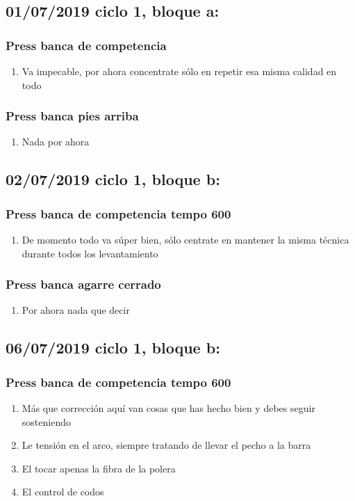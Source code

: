 \documentclass[11pt]{article}
\begin{document}
\subsection{01/07/2019 ciclo 1, bloque a:}
\label{sec:org44a0863}
\subsubsection{Press banca de competencia}
\label{sec:org559d035}
\begin{enumerate}
\item Va impecable, por ahora concentrate sólo en repetir esa misma
calidad en todo
\end{enumerate}
\subsubsection{Press banca pies arriba}
\label{sec:org34ed770}
\begin{enumerate}
\item Nada por ahora
\end{enumerate}
\subsection{02/07/2019 ciclo 1, bloque b:}
\label{sec:org2bb1c0a}
\subsubsection{Press banca de competencia tempo 600}
\label{sec:orgfeb912c}
\begin{enumerate}
\item De momento todo va súper bien, sólo centrate en mantener la misma
técnica durante todos los levantamiento
\end{enumerate}
\subsubsection{Press banca agarre cerrado}
\label{sec:orgb4729da}
\begin{enumerate}
\item Por ahora nada que decir
\end{enumerate}
\subsection{06/07/2019 ciclo 1, bloque b:}
\label{sec:orgd926e97}
\subsubsection{Press banca de competencia tempo 600}
\label{sec:org28df25e}
\begin{enumerate}
\item Más que corrección aquí van cosas que has hecho bien y debes seguir
sosteniendo
\item Le tensión en el arco, siempre tratando de llevar el pecho a la
barra
\item El tocar apenas la fibra de la polera
\item El control de codos
\end{enumerate}
\end{document}
